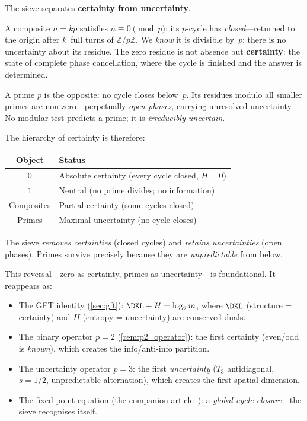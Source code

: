 \documentclass[12pt,a4paper]{article}
\begin{document}
\begin{remark}
\label{rem:zero_certainty}
The sieve separates \textbf{certainty from uncertainty}.

A composite $n = kp$ satisfies $n \equiv 0 \pmod{p}$: its
$p$-cycle has \emph{closed}---returned to the origin after $k$~full
turns of $\mathbb{Z}/p\mathbb{Z}$.  We \emph{know} it is divisible
by~$p$; there is no uncertainty about its residue.  The zero residue
is not absence but \textbf{certainty}: the state of complete
phase cancellation, where the cycle is finished and the answer
is determined.

A prime $p$ is the opposite: no cycle closes below~$p$.  Its residues
modulo all smaller primes are non-zero---perpetually
\emph{open phases}, carrying unresolved uncertainty.
No modular test predicts a prime; it is \emph{irreducibly uncertain}.

The hierarchy of certainty is therefore:
\begin{center}
\begin{tabular}{cl}
\toprule
\textbf{Object} & \textbf{Status} \\
\midrule
$0$     & Absolute certainty (every cycle closed, $H = 0$) \\
$1$     & Neutral (no prime divides; no information) \\
Composites & Partial certainty (some cycles closed) \\
Primes  & Maximal uncertainty (no cycle closes) \\
\bottomrule
\end{tabular}
\end{center}
The sieve \emph{removes certainties} (closed cycles) and
\emph{retains uncertainties} (open phases).  Primes survive
precisely because they are \emph{unpredictable} from below.

This reversal---zero as certainty, primes as uncertainty---is
foundational.  It reappears as:
\begin{itemize}[nosep]
\item The GFT identity (\cref{sec:gft}): $\DKL + H = \log_2 m$,
  where $\DKL$ (structure = certainty) and $H$ (entropy = uncertainty)
  are conserved duals.
\item The binary operator $p = 2$ (\cref{rem:p2_operator}):
  the first certainty (even/odd is \emph{known}), which creates
  the info/anti-info partition.
\item The uncertainty operator $p = 3$: the first \emph{uncertainty}
  ($T_3$ antidiagonal, $s = 1/2$, unpredictable alternation),
  which creates the first spatial dimension.
\item The fixed-point equation (the companion article~\cite{companion_M3}):
  a \emph{global cycle closure}---the sieve recognises itself.
\end{itemize}
\end{remark}
\end{document}
